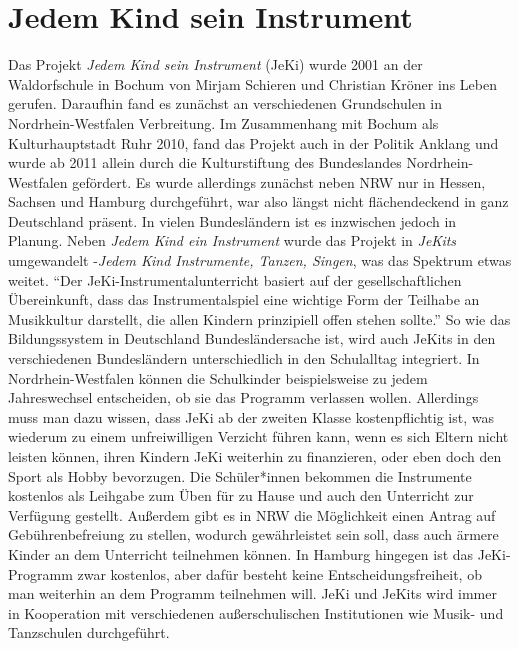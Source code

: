 \section{Jedem Kind sein Instrument}

Das Projekt \emph{Jedem Kind sein Instrument} (JeKi) wurde 2001 an der Waldorfschule in
Bochum von Mirjam Schieren und Christian Kröner ins Leben gerufen. Daraufhin
fand es zunächst an verschiedenen Grundschulen in Nordrhein-Westfalen
Verbreitung. Im Zusammenhang mit Bochum als Kulturhauptstadt Ruhr 2010, fand das
Projekt auch in der Politik Anklang und wurde ab 2011 allein durch die
Kulturstiftung des Bundeslandes Nordrhein-Westfalen gefördert. Es wurde
allerdings zunächst neben NRW nur in Hessen, Sachsen und Hamburg durchgeführt,
war also längst nicht flächendeckend in ganz Deutschland präsent. In vielen
Bundesländern ist es inzwischen jedoch in Planung. Neben \emph{Jedem Kind ein
Instrument} wurde das Projekt in \emph{JeKits} umgewandelt -\emph{Jedem Kind
Instrumente, Tanzen, Singen}, was das Spektrum etwas weitet. \enquote{Der
JeKi-Instrumentalunterricht basiert auf der gesellschaftlichen Übereinkunft,
dass das Instrumentalspiel eine wichtige Form der Teilhabe an Musikkultur
darstellt, die allen Kindern prinzipiell offen stehen
sollte.}\autocite[94]{krupp_schleussner:jeki} So wie das Bildungssystem in
Deutschland Bundesländersache ist, wird auch JeKits in den verschiedenen
Bundesländern unterschiedlich in den Schulalltag integriert. In
Nordrhein-Westfalen können die Schulkinder beispielsweise zu jedem Jahreswechsel
entscheiden, ob sie das Programm verlassen wollen.
\autocite[95]{krupp_schleussner:jeki} Allerdings muss man dazu wissen, dass JeKi
ab der zweiten Klasse kostenpflichtig ist, was wiederum zu einem unfreiwilligen
Verzicht führen kann, wenn es sich Eltern nicht leisten können, ihren Kindern
JeKi weiterhin zu finanzieren, oder eben doch den Sport als Hobby bevorzugen.
Die Schüler*innen bekommen die Instrumente kostenlos als Leihgabe zum Üben für
zu Hause und auch den Unterricht zur Verfügung gestellt. Außerdem gibt es in NRW
die Möglichkeit einen Antrag auf Gebührenbefreiung zu stellen, wodurch
gewährleistet sein soll, dass auch ärmere Kinder an dem Unterricht teilnehmen
können. In Hamburg hingegen ist das JeKi-Programm zwar kostenlos, aber dafür
besteht keine Entscheidungsfreiheit, ob man weiterhin an dem Programm teilnehmen
will.
\autocite[95]{krupp_schleussner:jeki}
JeKi und JeKits wird immer in Kooperation mit verschiedenen außerschulischen
Institutionen wie Musik- und Tanzschulen durchgeführt.

